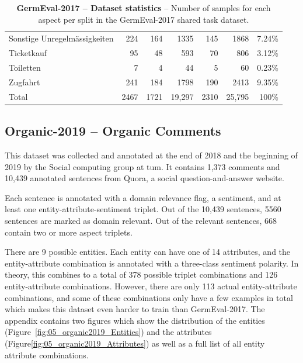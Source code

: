 \begin{table}
\begin{tabular}{lrrrrrr}
        Sonstige Unregelmässigkeiten & 224    & 164    & 1335   & 145  & 1868   & 7.24\%  \\
        Ticketkauf                   & 95     & 48     & 593    & 70   & 806    & 3.12\%  \\
        Toiletten                    & 7      & 4      & 44     & 5    & 60     & 0.23\%  \\
        Zugfahrt                     & 241    & 184    & 1798   & 190  & 2413   & 9.35\%  \\ 
        \midrule
        Total                        & 2467   & 1721   & 19,297 & 2310 & 25,795 & 100\%   \\ 
        \bottomrule
    \end{tabular}
    \caption{\textbf{GermEval-2017 -- Dataset statistics} -- Number of samples for each aspect per split in the GermEval-2017 shared task dataset.}
\label{tab:05_germevalDatasetStats}
\end{table}

\subsection{Organic-2019 -- Organic Comments}
\label{sec:05_organic2019}
This dataset was collected and annotated at the end of 2018 and the beginning of 2019 by the Social computing group at \gls{tum}. It contains 1,373 comments and 10,439 annotated sentences from Quora, a social question-and-answer website.
\medskip

Each sentence is annotated with a domain relevance flag, a sentiment, and at least one entity-attribute-sentiment triplet. Out of the 10,439 sentences, 5560 sentences are marked as domain relevant. Out of the relevant sentences, 668 contain two or more aspect triplets.
\medskip

There are 9 possible entities. Each entity can have one of 14 attributes, and the entity-attribute combination is annotated with a three-class sentiment polarity. In theory, this combines to a total of 378 possible triplet combinations and 126 entity-attribute combinations. However, there are only 113 actual entity-attribute combinations, and some of these combinations only have a few examples in total which makes this dataset even harder to train than GermEval-2017. The appendix contains two figures which show the distribution of the entities {(Figure~\ref{fig:05_organic2019_Entities})} and the attributes {(Figure\ref{fig:05_organic2019_Attributes})} as well as a full list of all entity attribute combinations.
\medskip

